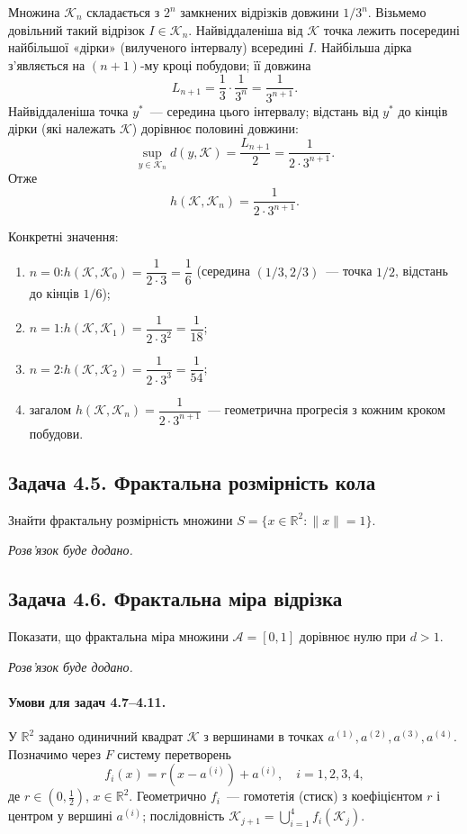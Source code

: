 \documentclass[12pt,a4paper]{article}
\newcommand{\placeholder}{%
  \par\medskip\noindent\textit{Розв'язок буде додано.}%
}
\begin{document}
Множина $\mathcal{K}_n$ складається з $2^n$ замкнених відрізків довжини $1/3^n$.
Візьмемо довільний такий відрізок $I\in\mathcal{K}_n$. Найвіддаленіша від $\mathcal{K}$
точка лежить посередині найбільшої «дірки» (вилученого інтервалу) всередині $I$.
Найбільша дірка з'являється на $(n{+}1)$-му кроці побудови; її довжина
\begin{equation*}
  L_{n+1}=\frac13\cdot\frac{1}{3^n}=\frac{1}{3^{n+1}}.
\end{equation*}
Найвіддаленіша точка $y^*$~--- середина цього інтервалу; відстань від $y^*$ до
кінців дірки (які належать $\mathcal{K}$) дорівнює половині довжини:
\begin{equation*}
  \sup_{y\in\mathcal{K}_n}d(y,\mathcal{K})=\frac{L_{n+1}}{2}=\frac{1}{2\cdot3^{n+1}}.
\end{equation*}
Отже
\begin{equation*}
  h(\mathcal{K},\mathcal{K}_n)=\frac{1}{2\cdot3^{n+1}}.
\end{equation*}

Конкретні значення:
\begin{enumerate}[leftmargin=1.6em,itemsep=0.25em]
  \item $n=0$:\quad $h(\mathcal{K},\mathcal{K}_0)=\dfrac{1}{2\cdot3}=\dfrac16$
        (середина $(1/3,2/3)$~--- точка $1/2$, відстань до кінців $1/6$);
  \item $n=1$:\quad $h(\mathcal{K},\mathcal{K}_1)=\dfrac{1}{2\cdot3^2}=\dfrac{1}{18}$;
  \item $n=2$:\quad $h(\mathcal{K},\mathcal{K}_2)=\dfrac{1}{2\cdot3^3}=\dfrac{1}{54}$;
  \item загалом $h(\mathcal{K},\mathcal{K}_n)=\dfrac{1}{2\cdot3^{n+1}}$~---
        геометрична прогресія з кожним кроком побудови.
\end{enumerate}

\subsection{Задача 4.5. Фрактальна розмірність кола}
Знайти фрактальну розмірність множини
$S=\{x\in\mathbb{R}^2:\|x\|=1\}$.
\placeholder

\subsection{Задача 4.6. Фрактальна міра відрізка}
Показати, що фрактальна міра множини $\mathcal{A}=[0,1]$ дорівнює нулю при $d>1$.
\placeholder

\paragraph{Умови для задач 4.7--4.11.}
У $\mathbb{R}^2$ задано одиничний квадрат $\mathcal{K}$ з вершинами в точках
$a^{(1)},a^{(2)},a^{(3)},a^{(4)}$. Позначимо через $F$ систему перетворень
\begin{equation*}
  f_i(x)=r(x-a^{(i)})+a^{(i)},\quad i=1,2,3,4,
\end{equation*}
де $r\in(0,\tfrac12)$, $x\in\mathbb{R}^2$.
Геометрично $f_i$~--- гомотетія (стиск) з коефіцієнтом $r$ і центром у вершині
$a^{(i)}$; послідовність $\mathcal{K}_{j+1}=\bigcup_{i=1}^4 f_i(\mathcal{K}_j)$.
\end{document}
